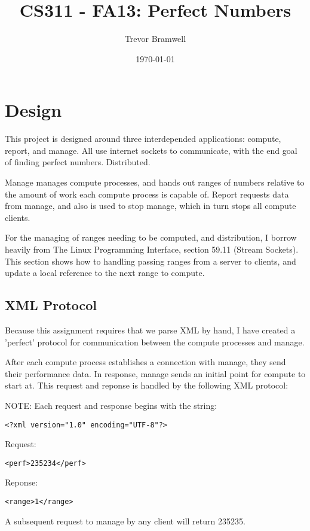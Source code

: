 \documentclass[letterpaper,10pt]{article}
\title{CS311 - FA13: Perfect Numbers}
\date{\today}
\author{Trevor Bramwell}
\begin{document}
\maketitle

\section{Design}

This project is designed around three interdepended applications:
compute, report, and manage. All use internet sockets to communicate,
with the end goal of finding perfect numbers. Distributed.

Manage manages compute processes, and hands out ranges of numbers
relative to the amount of work each compute process is capable of.
Report requests data from manage, and also is used to stop manage,
which in turn stops all compute clients.

For the managing of ranges needing to be computed, and distribution, I
borrow heavily from The Linux Programming Interface, section 59.11
(Stream Sockets). This section shows how to handling passing ranges from
a server to clients, and update a local reference to the next range to
compute.

\subsection{XML Protocol}
Because this assignment requires that we parse XML by hand, I have
created a 'perfect' protocol for communication between the compute
processes and manage.

After each compute process establishes a connection with manage, they
send their performance data. In response, manage sends an initial point
for compute to start at. This request and reponse is handled by the
following XML protocol:

NOTE: Each request and response begins with the string:
\begin{verbatim}
<?xml version="1.0" encoding="UTF-8"?>
\end{verbatim}

Request:
\begin{verbatim}
<perf>235234</perf>
\end{verbatim}

Reponse:
\begin{verbatim}
<range>1</range>
\end{verbatim}

A subsequent request to manage by any client will return 235235.
\end{document}
